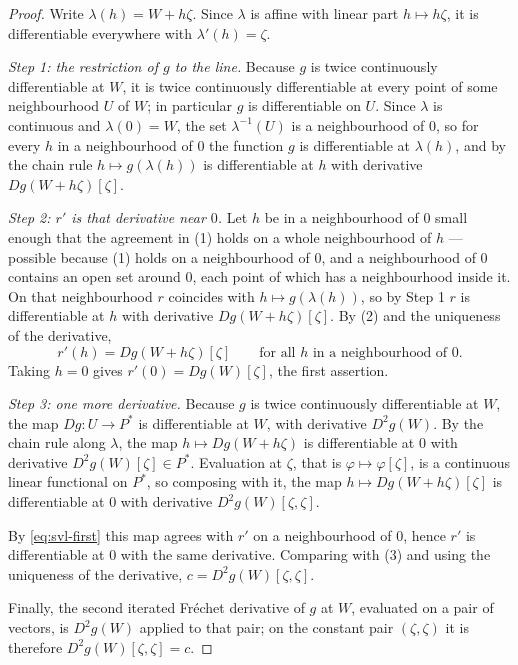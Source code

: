 \begin{proof}
Write $\lambda(h)=W+h\zeta$. Since $\lambda$ is affine with linear part $h\mapsto
h\zeta$, it is differentiable everywhere with $\lambda'(h)=\zeta$.

\emph{Step 1: the restriction of $g$ to the line.}
Because $g$ is twice continuously differentiable at $W$, it is twice continuously
differentiable at every point of some neighbourhood $U$ of $W$; in particular $g$
is differentiable on $U$. Since $\lambda$ is continuous and $\lambda(0)=W$, the set
$\lambda^{-1}(U)$ is a neighbourhood of $0$, so for every $h$ in a neighbourhood of
$0$ the function $g$ is differentiable at $\lambda(h)$, and by the chain rule
$h\mapsto g(\lambda(h))$ is differentiable at $h$ with derivative
$Dg(W+h\zeta)[\zeta]$.

\emph{Step 2: $r'$ is that derivative near $0$.}
Let $h$ be in a neighbourhood of $0$ small enough that the agreement in (1) holds on
a whole neighbourhood of $h$ — possible because (1) holds on a neighbourhood of $0$,
and a neighbourhood of $0$ contains an open set around $0$, each point of which has
a neighbourhood inside it. On that neighbourhood $r$ coincides with $h\mapsto
g(\lambda(h))$, so by Step 1 $r$ is differentiable at $h$ with derivative
$Dg(W+h\zeta)[\zeta]$. By (2) and the uniqueness of the derivative,
\begin{equation}\label{eq:svl-first}
  r'(h)=Dg(W+h\zeta)[\zeta]
  \qquad\text{for all $h$ in a neighbourhood of $0$.}
\end{equation}
Taking $h=0$ gives $r'(0)=Dg(W)[\zeta]$, the first assertion.

\emph{Step 3: one more derivative.}
Because $g$ is twice continuously differentiable at $W$, the map $Dg:U\to P^{*}$ is
differentiable at $W$, with derivative $D^2g(W)$. By the chain rule along $\lambda$,
the map $h\mapsto Dg(W+h\zeta)$ is differentiable at $0$ with derivative
$D^2g(W)[\zeta]\in P^{*}$. Evaluation at $\zeta$, that is $\varphi\mapsto
\varphi[\zeta]$, is a continuous linear functional on $P^{*}$, so composing with it,
the map $h\mapsto Dg(W+h\zeta)[\zeta]$ is differentiable at $0$ with derivative
$D^2g(W)[\zeta,\zeta]$.

By \eqref{eq:svl-first} this map agrees with $r'$ on a neighbourhood of $0$, hence
$r'$ is differentiable at $0$ with the same derivative. Comparing with (3) and using
the uniqueness of the derivative, $c=D^2g(W)[\zeta,\zeta]$.

Finally, the second iterated Fréchet derivative of $g$ at $W$, evaluated on a pair
of vectors, is $D^2g(W)$ applied to that pair; on the constant pair $(\zeta,\zeta)$
it is therefore $D^2g(W)[\zeta,\zeta]=c$.
\end{proof}
